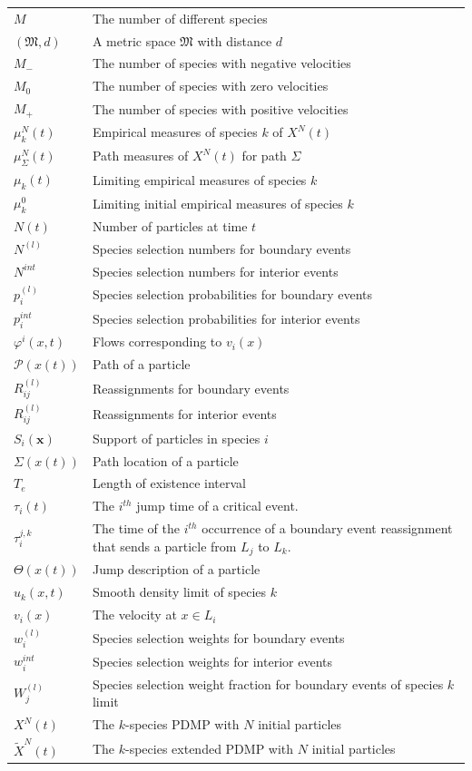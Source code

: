 \begin{longtable}[l]{p{50pt}  p{300pt}}
 $M$ & The number of  different species\\
  $(\mathfrak M,d)$ & A metric space $\mathfrak M$ with distance $d$\\
  $M_-$ & The number of  species with negative velocities\\
 $M_0$ & The number of  species with zero velocities\\
 $M_+$ & The number of  species with positive velocities\\
 $\mu^N_k(t)$ & Empirical measures of species $k$ of $X^N(t)$ \\
$\mu^N_\Sigma(t)$ & Path measures of $X^N(t)$ for path $\Sigma$ \\
$\mu_k(t)$ & Limiting empirical measures of species $k$\\
$\mu_k^0$ & Limiting initial empirical measures of species $k$\\
 $N(t)$    & Number of particles at time $t$\\
 $N^{(l)}$ & Species selection numbers for boundary events\\
$N^{int}$ & Species selection numbers for interior events\\
$p_i^{(l)}$ & Species selection probabilities for boundary events\\
$p_i^{int}$ & Species selection probabilities for interior events\\
$\varphi^i(x,t)$ & Flows corresponding to $v_i(x)$\\
$\mathscr P(x(t))$ & Path of a particle\\
$R_{ij}^{(l)}$ & Reassignments for boundary events\\
$R_{ij}^{(l)}$ & Reassignments for interior events\\
$S_i(\mathbf x)$ & Support of particles in species $i$\\
$\Sigma(x(t))$ & Path location of a particle\\
$T_e$ & Length of existence interval\\
$\tau_i(t)$ & The $i^{th}$ jump time of a critical event.\\
$\tau_i^{j,k}$ & The time of the $i^{th}$ occurrence of a boundary event reassignment  that sends a particle from $L_j$ to $L_k$.\\
$\Theta(x(t))$ & Jump description of a particle\\
$u_k(x,t)$ & Smooth density limit of species $k$\\
$v_{i}(x)$ & The velocity at $x \in L_i$\\
$w_{i}^{(l)}$ & Species selection weights for boundary events \\
$w_{i}^{int}$ & Species selection weights for interior events \\
$W_{j}^{(l)}$ & Species selection weight fraction for boundary events of species $k$ limit\\
$X^N(t)$ & The $k$-species PDMP with $N$ initial particles\\
$\tilde X^N(t)$ & The $k$-species extended PDMP with $N$ initial particles

\end{longtable}  
